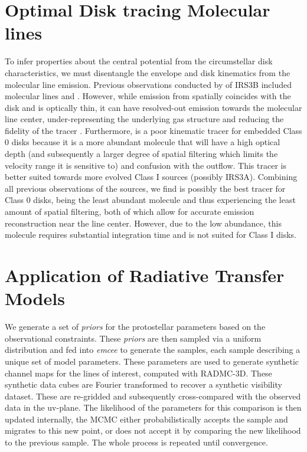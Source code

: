 \section{Optimal Disk tracing Molecular lines} %
To infer properties about the central potential from the circumstellar disk characteristics, we must disentangle the envelope and disk kinematics from the molecular line emission. Previous observations conducted by \citet{2016Natur.538..483T}\space of IRS3B included molecular lines \ceo\space and \tco. However, while emission from \ceo\space spatially coincides with the disk and is optically thin, it can have resolved-out emission towards the molecular line center, under-representing the underlying gas structure and reducing the fidelity of the tracer \citep{2020MNRAS.493L.108B}. Furthermore, \tco\space is a poor kinematic tracer for embedded Class 0 disks because it is a more abundant molecule that will have a high optical depth (and subsequently a larger degree of spatial filtering which limits the velocity range it is sensitive to) and confusion with the outflow. This tracer is better suited towards more evolved Class I sources (possibly IRS3A). Combining all previous observations of the sources, we find \cso\space is possibly the best tracer for Class 0 disks, being the least abundant molecule and thus experiencing the least amount of spatial filtering, both of which allow for accurate emission reconstruction near the line center. However, due to the low abundance, this molecule requires substantial integration time and is not suited for Class I disks.


\section{Application of Radiative Transfer Models}\label{sec:apppdspy} %
We generate a set of \textit{priors} for the protostellar parameters based on the observational constraints. These \textit{priors} are then sampled via a uniform distribution and fed into \textit{emcee} to generate the samples, each sample describing a unique set of model parameters. These parameters are used to generate synthetic channel maps for the lines of interest, computed with RADMC-3D. These synthetic data cubes are Fourier transformed to recover a synthetic visibility dataset. These are re-gridded and subsequently cross-compared with the observed data in the uv-plane. The likelihood of the parameters for this comparison is then updated internally, the MCMC either probabilistically accepts the sample and migrates to this new point, or does not accept it by comparing the new likelihood to the previous sample. The whole process is repeated until convergence.

